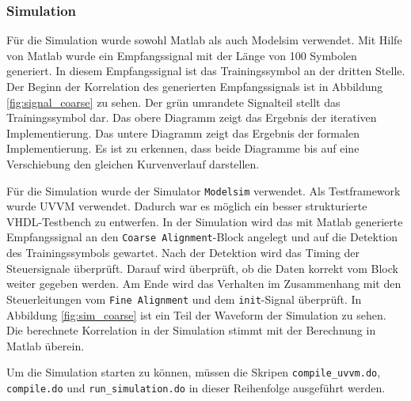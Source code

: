 \subsubsection{Simulation}
Für die Simulation wurde sowohl Matlab als auch Modelsim verwendet. Mit Hilfe von Matlab wurde ein Empfangssignal mit der Länge von 100 Symbolen generiert. In diesem Empfangssignal ist das Trainingssymbol an der dritten Stelle. Der Beginn der Korrelation des generierten Empfangssignals ist in Abbildung \ref{fig:signal_coarse} zu sehen. Der grün umrandete Signalteil stellt das Trainingssymbol dar. Das obere Diagramm zeigt das Ergebnis der iterativen Implementierung. Das untere Diagramm zeigt das Ergebnis der formalen Implementierung. Es ist zu erkennen, dass beide Diagramme bis auf eine Verschiebung den gleichen Kurvenverlauf darstellen.

\begin{center}
\end{center}

Für die Simulation wurde der Simulator \texttt{Modelsim} verwendet. Als Testframework wurde UVVM verwendet. Dadurch war es möglich ein besser strukturierte VHDL-Testbench zu entwerfen. In der Simulation wird das mit Matlab generierte Empfangssignal an den \texttt{Coarse Alignment}-Block angelegt und auf die Detektion des Trainingssymbols gewartet. Nach der Detektion wird das Timing der Steuersignale überprüft. Darauf wird überprüft, ob die Daten korrekt vom Block weiter gegeben werden. Am Ende wird das Verhalten im Zusammenhang mit den Steuerleitungen vom \texttt{Fine Alignment} und dem \texttt{init}-Signal überprüft. In Abbildung \ref{fig:sim_coarse} ist ein Teil der Waveform der Simulation zu sehen. Die berechnete Korrelation in der Simulation stimmt mit der Berechnung in Matlab überein.

\begin{center}
\end{center}

Um die Simulation starten zu können, müssen die Skripen \texttt{compile\_uvvm.do}, \texttt{compile.do} und \texttt{run\_simulation.do} in dieser Reihenfolge ausgeführt werden.

